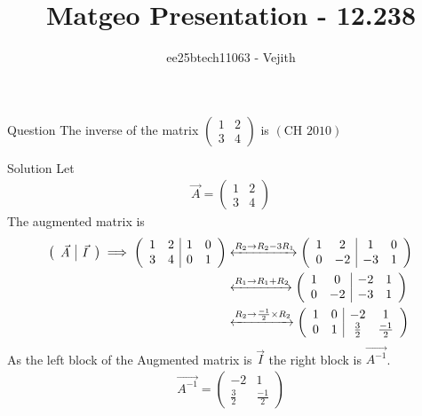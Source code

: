 \documentclass{beamer}
\title{Matgeo Presentation - 12.238}
\author{ee25btech11063 - Vejith}
\numberwithin{equation}{section}
\providecommand{\brak}[1]{\ensuremath{\left(#1\right)}}
\theoremstyle{remark}
\begin{document}
\frame{\titlepage}
\begin{frame}{Question}
The inverse of the matrix
$\begin{pmatrix}
    1 & 2\\
    3 & 4
\end{pmatrix}$ is \hspace{4cm} \brak{\text{CH }2010}
\end{frame}

\begin{frame}{Solution}
    Let 
\begin{align}
    \Vec{A}=\begin{pmatrix}
    1 & 2\\
    3 & 4
\end{pmatrix}
\end{align}
The augmented matrix is 
\begin{align}
    \left(\begin{array}{c|c}
        \Vec{A} & \Vec{I}
\end{array}\right)
\implies 
\left(\begin{array}{cc|cc}
        1 & 2 & 1 & 0\\
        3 & 4 &  0 & 1
\end{array}\right)  &\xleftrightarrow{R_2 \rightarrow R_2-3R_1} \left(\begin{array}{cc|cc}
        1 & 2 & 1 & 0\\
        0 & -2 &  -3 & 1
\end{array}\right)\\
&\xleftrightarrow{R_1 \rightarrow R_1 + R_2} \left(\begin{array}{cc|cc}
        1 & 0 & -2 & 1\\
        0 & -2 &  -3 & 1
\end{array}\right)\\
&\xleftrightarrow{R_2 \rightarrow \frac{-1}{2} \times R_2} \left(\begin{array}{cc|cc}
        1 & 0 & -2 & 1\\
        0 & 1 &  \frac{3}{2} & \frac{-1}{2}
\end{array}\right)
\end{align}
As the left block of the Augmented matrix is $\Vec{I}$ the right block is $\Vec{A^{-1}}$.
\begin{align}
    \Vec{A^{-1}}=\begin{pmatrix}
    -2 & 1\\
    \frac{3}{2} & \frac{-1}{2}
\end{pmatrix}
\end{align}
\end{frame}
\end{document}

